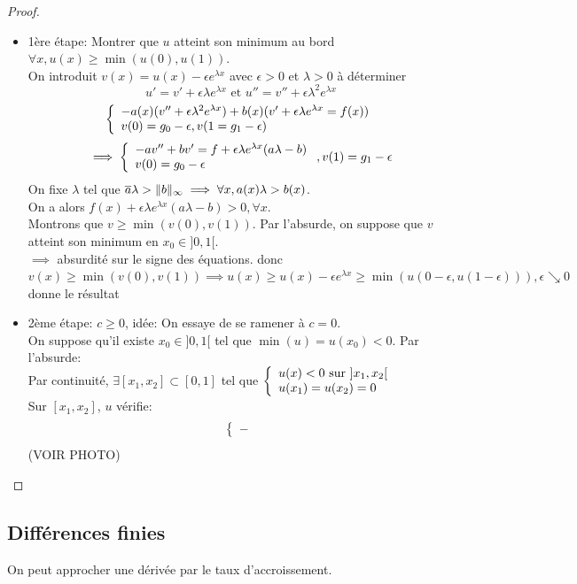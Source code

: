 \documentclass[]{report}
\begin{document}
    \begin{proof}
        \begin{itemize}
            \item 1ère étape: Montrer que $u$ atteint son minimum au bord $\forall x, u(x)\ge \min(u(0),u(1))$.\\
            On introduit $v(x)=u(x)-\epsilon e^{\lambda x}$ avec $\epsilon>0$ et $\lambda>0$ à déterminer
            \[u'=v'+\epsilon \lambda e^{\lambda x}\text{ et }u'' = v'' +\epsilon \lambda^2 e^{\lambda x}\]
            \[\left\{\begin{array}{ll} -a(x)(v''+\epsilon \lambda^2 e^{\lambda x})+b(x)(v'+\epsilon \lambda e^{\lambda x}=f(x))\\ v(0)=g_0-\epsilon,v(1=g_1-\epsilon) \end{array} \right.\]
            \[\implies \left\{\begin{array}{ll} -av''+bv'=f+\epsilon\lambda e^{\lambda x}(a\lambda-b)\\ v(0)=g_0-\epsilon \end{array} \right.,v(1)=g_1-\epsilon\]
            On fixe $\lambda $ tel que $\overline{a}\lambda>\lVert b \rVert_{\infty}\implies \forall x, a(x)\lambda>b(x)$.\\
            On a alors $f(x)+\epsilon \lambda e^{\lambda x}(a\lambda - b)>0,\forall x$.\\
            Montrons que $v\ge \min (v(0),v(1))$. Par l'absurde, on suppose que $v$ atteint son minimum en $x_0\in ]0,1[$.\\
            $\implies$ absurdité sur le signe des équations. donc $v(x)\ge \min (v(0),v(1))\implies u(x)\ge u(x)-\epsilon e^{\lambda x}\ge \min(u(0-\epsilon,u(1-\epsilon))),\epsilon \searrow 0$ donne le résultat
            \item 2ème étape: $c\ge 0$, idée: On essaye de se ramener à $c=0$.\\
            On suppose qu'il existe $x_0\in ]0,1[$ tel que $\min(u)=u(x_0)<0$. Par l'absurde:\\
            Par continuité, $\exists [x_1 ,x_2 ]\subset [0,1]$ tel que $\left\{\begin{array}{ll} u(x)<0\text{ sur $]x_1,x_2[$}\\u(x_1)=u(x_2)=0 \end{array} \right.$ \\
            Sur $[x_1,x_2]$, $u$ vérifie:
            \[\left\{\begin{array}{ll} - \end{array} \right.\]
            (VOIR PHOTO)
        \end{itemize}
    \end{proof}

    \subsection{Différences finies}

    On peut approcher une dérivée par le taux d'accroissement.
\end{document}
